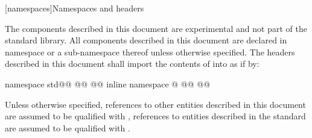 
[namespaces]{Namespaces and headers}


\pnum
The components described in this document are experimental and not part of the \Cpp standard library. All components described in this document are declared in namespace  or a sub-namespace thereof unless otherwise specified. The headers described in this document shall import the contents of  into  as if by:

\begin{codeblock}
namespace std@@ {
  @@
    @@
      inline namespace @\namespacever@ {}
    @\removed{\}}@
  @\removed{\}}@
}
\end{codeblock}

\pnum
Unless otherwise specified, references to other entities described in this document are assumed to be qualified with , references to entities described in the \Cpp standard are assumed to be qualified with .


